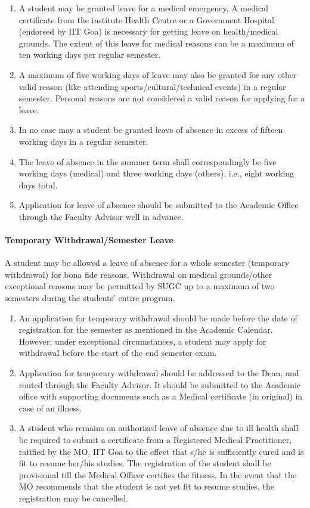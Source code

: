 \begin{enumerate}[leftmargin=15mm]
    \item A student may be granted leave for a medical emergency. A medical certificate from the institute Health Centre or a Government Hospital (endorsed by IIT Goa) is necessary for getting leave on health/medical grounds. The extent of this leave for medical reasons can be a maximum of ten working days per regular semester. 
    \item A maximum of five working days of leave may also be granted for any other valid reason (like attending sports/cultural/technical events) in a regular semester. Personal reasons are not considered a valid reason for applying for a leave.
    \item In no case may a student be granted leave of absence in excess of fifteen working days in a regular semester. 
    \item The leave of absence in the summer term shall correspondingly be five working days (medical) and three working days (others), i.e., eight working days total. 
    \item Application for leave of absence should be submitted to the Academic Office through the Faculty Advisor well in advance.
\end{enumerate}

\paragraph{Temporary Withdrawal/Semester Leave} A student may be allowed a leave of absence for a whole semester (temporary withdrawal) for bona fide reasons. Withdrawal on medical grounds/other exceptional reasons may be permitted by SUGC up to a maximum of two semesters during the students' entire program.

\begin{enumerate}[leftmargin=15mm]
    \item An application for temporary withdrawal should be made before the date of registration for the semester as mentioned in the Academic Calendar. However, under exceptional circumstances, a student may apply for withdrawal before the start of the end semester exam.
    \item Application for temporary withdrawal should be addressed to the Dean, and routed through the Faculty Advisor. It should be submitted to the Academic office with supporting documents such as a Medical certificate (in original) in case of an illness. 
    \item A student who remains on authorized leave of absence due to ill health shall be required to submit a certificate from a Registered Medical Practitioner, ratified by the MO, IIT Goa to the effect that s/he is sufficiently cured and is fit to resume her/his studies. The registration of the student shall be provisional till the Medical Officer certifies the fitness. In the event that the MO recommends that the student is not yet fit to resume studies, the registration may be cancelled.
\end{enumerate}

